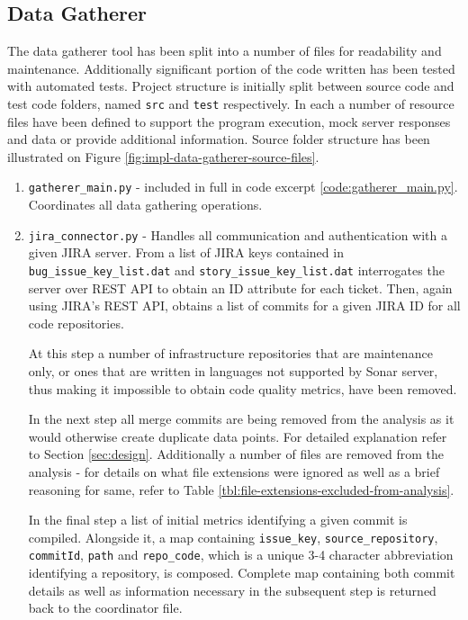 \subsection{Data Gatherer}\label{sec:impl-data-gatherer}
The data gatherer tool has been split into a number of files for readability and maintenance. Additionally significant portion of the code written has been tested with automated tests. Project structure is initially split between source code and test code folders, named \texttt{src} and \texttt{test} respectively. In each a number of resource files have been defined to support the program execution, mock server responses and data or provide additional information. Source folder structure has been illustrated on Figure \ref{fig:impl-data-gatherer-source-files}.
\begin{enumerate}
    \item \texttt{gatherer\_main.py} - included in full in code excerpt \ref{code:gatherer_main.py}. Coordinates all data gathering operations. 
    \item\label{lst:impl.item:jira} \texttt{jira\_connector.py} - Handles all communication and authentication with a given JIRA server. From a list of JIRA keys contained in \texttt{bug\_issue\_key\_list.dat} and \texttt{story\_issue\_key\_list.dat} interrogates the server over REST API to obtain an ID attribute for each ticket. Then, again using JIRA's REST API, obtains a list of commits for a given JIRA ID for all code repositories. 
    
    At this step a number of infrastructure repositories that are maintenance only, or ones that are written in languages not supported by Sonar server, thus making it impossible to obtain code quality metrics, have been removed.
    
    In the next step all merge commits are being removed from the analysis as it would otherwise create duplicate data points. For detailed explanation refer to Section \ref{sec:design}. Additionally a number of files are removed from the analysis - for details on what file extensions were ignored as well as a brief reasoning for same, refer to Table \ref{tbl:file-extensions-excluded-from-analysis}.
    
    In the final step a list of initial metrics identifying a given commit is compiled. Alongside it, a map containing \texttt{issue\_key}, \texttt{source\_repository}, \texttt{commitId}, \texttt{path} and \texttt{repo\_code}, which is a unique 3-4 character abbreviation identifying a repository, is composed. Complete map containing both commit details as well as information necessary in the subsequent step is returned back to the coordinator file. 
    

\end{enumerate}
